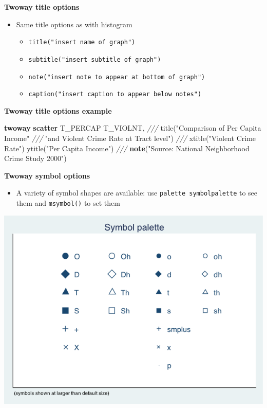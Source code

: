 \documentclass[
]{book}
\newenvironment{Shaded}{\begin{snugshade}}{\end{snugshade}}
\newcommand{\BaseNTok}[1]{\textcolor[rgb]{0.00,0.00,0.81}{#1}}
\newcommand{\CommentTok}[1]{\textcolor[rgb]{0.56,0.35,0.01}{\textit{#1}}}
\newcommand{\KeywordTok}[1]{\textcolor[rgb]{0.13,0.29,0.53}{\textbf{#1}}}
\newcommand{\NormalTok}[1]{#1}
\newcommand{\StringTok}[1]{\textcolor[rgb]{0.31,0.60,0.02}{#1}}
\providecommand{\tightlist}{%
  \setlength{\itemsep}{0pt}\setlength{\parskip}{0pt}}
\begin{document}
\textbf{Twoway title options}

\begin{itemize}
\tightlist
\item
  Same title options as with histogram

  \begin{itemize}
  \tightlist
  \item
    \texttt{title("insert\ name\ of\ graph")}
  \item
    \texttt{subtitle("insert\ subtitle\ of\ graph")}
  \item
    \texttt{note("insert\ note\ to\ appear\ at\ bottom\ of\ graph")}
  \item
    \texttt{caption("insert\ caption\ to\ appear\ below\ notes")}
  \end{itemize}
\end{itemize}

\textbf{Twoway title options example}

\begin{Shaded}
\begin{Highlighting}[]
\KeywordTok{twoway} \KeywordTok{scatter}\NormalTok{ T\_PERCAP T\_VIOLNT, }\CommentTok{///}
    \BaseNTok{title}\NormalTok{(}\StringTok{"Comparison of Per Capita Income"} \CommentTok{///}
          \StringTok{"and Violent Crime Rate at Tract level"}\NormalTok{) }\CommentTok{///}
    \BaseNTok{xtitle}\NormalTok{(}\StringTok{"Violent Crime Rate"}\NormalTok{) }\BaseNTok{ytitle}\NormalTok{(}\StringTok{"Per Capita Income"}\NormalTok{) }\CommentTok{///}
    \KeywordTok{note}\NormalTok{(}\StringTok{"Source: National Neighborhood Crime Study 2000"}\NormalTok{)}
\end{Highlighting}
\end{Shaded}

\textbf{Twoway symbol options}

\begin{itemize}
\tightlist
\item
  A variety of symbol shapes are available: use \texttt{palette\ symbolpalette} to see them and \texttt{msymbol()} to set them
\end{itemize}

\includegraphics{Stata/StataGraphics/images/Symbol.png}
\end{document}
